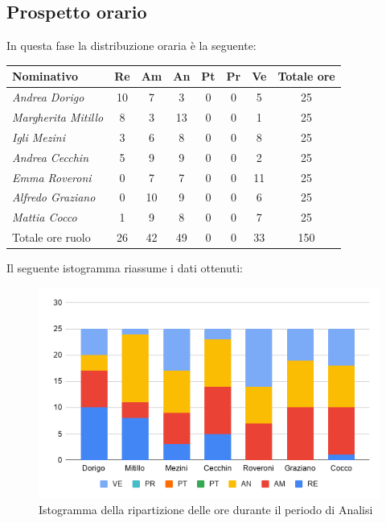\subsection{Prospetto orario}\label{PreventivoFaseDiAnalisiProspettoOrario}
In questa fase la distribuzione oraria è la seguente:
\quad
\def\tabularxcolumn#1{m{#1}}
{
	
	\begin{center}
		\renewcommand{\arraystretch}{1.4}
		\begin{tabularx}{\textwidth}{|X|c|c|c|c|c|c|c|}
			\hline
			\rowcolor{airforceblue}
			\textbf{Nominativo} & \textbf{Re} & \textbf{Am} & \textbf{An} & \textbf{Pt} & \textbf{Pr} & \textbf{Ve} & \textbf{Totale ore}\\
			\hline
			\textit{Andrea Dorigo} & 10 & 7 & 3 & 0 & 0 & 5 & 25\\
			\hline
			\textit{Margherita Mitillo} & 8 & 3 & 13 & 0 & 0 & 1 & 25\\
			\hline
			\textit{Igli Mezini} & 3 & 6 & 8 & 0 & 0 & 8 & 25\\
			\hline
			\textit{Andrea Cecchin} & 5 & 9 & 9 & 0 & 0 & 2 & 25\\
			\hline
			\textit{Emma Roveroni} & 0 & 7 & 7 & 0 & 0 & 11 & 25\\
			\hline
			\textit{Alfredo Graziano} & 0 & 10 & 9 & 0 & 0 & 6 & 25\\
			\hline
			\textit{Mattia Cocco} & 1 & 9 & 8 & 0 & 0 & 7 & 25\\
			\hline
			Totale ore ruolo & 26 & 42 & 49 & 0 & 0 & 33 & 150\\
			\hline
		\end{tabularx}
	\end{center}

Il seguente istogramma riassume i dati ottenuti:
\begin{figure}[!ht]
	\begin{center}
		\includegraphics[width=0.8\linewidth]{../immagini/pdp/istogramma_analisi.png}
		\caption{Istogramma della ripartizione delle ore durante il periodo di Analisi}
	\end{center}
\end{figure}

}
